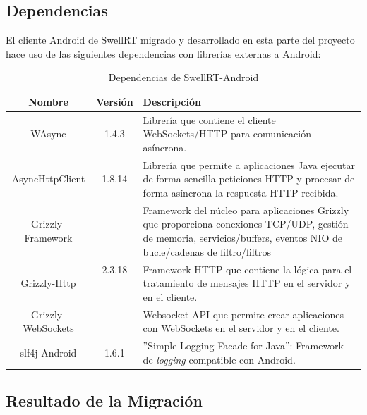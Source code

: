     \subsection{Dependencias}
    
    El cliente Android de SwellRT migrado y desarrollado en esta parte del proyecto hace uso de las siguientes dependencias con librerías externas a Android:

    \begin{table}[h]
      \footnotesize
      \begin{center}
	\begin{tabular}{ | c | c | m{8cm} | }
	  \hline
	  \textbf{Nombre} & \textbf{Versión} & \textbf{Descripción} \\
	  \hline
	  WAsync \cite{ref:wAsync_github} & 1.4.3 & Librería que contiene el cliente WebSockets/HTTP para comunicación asíncrona. \\ 
	  \hline
	  AsyncHttpClient \cite{ref:asyncHttpClient} & 1.8.14 & Librería que permite a aplicaciones Java ejecutar de forma sencilla peticiones HTTP y procesar de forma asíncrona la respuesta HTTP recibida. \\ 
	  \hline
	  Grizzly-Framework \cite{ref:grizzly} & \multirow{3}{*}{2.3.18} & Framework del núcleo para aplicaciones Grizzly que proporciona conexiones TCP/UDP, gestión de memoria, servicios/buffers, eventos NIO de bucle/cadenas de filtro/filtros \\ \cline{1-1} \cline{3-3} 
	  Grizzly-Http \cite{ref:grizzly} & & Framework HTTP que contiene la lógica para el tratamiento de mensajes HTTP en el servidor y en el cliente. \\ 
	  \cline{1-1} \cline{3-3} 
	  Grizzly-WebSockets \cite{ref:grizzly} & & Websocket API que permite crear aplicaciones con WebSockets en el servidor y en el cliente. \\ 
	  \hline
	  slf4j-Android \cite{ref:slf4j_android} & 1.6.1 & ''Simple Logging Facade for Java'': Framework de \textit{logging} compatible con Android. \\ 
	  \hline
	\end{tabular}
      \end{center}
      \caption{Dependencias de SwellRT-Android}
      \label{fig:dependencies_swellRT}
    \end{table}       
       
    \subsection{Resultado de la Migración} \label{ssec:migrationResult}
    
